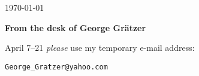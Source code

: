 \documentclass{sample}
\begin{document}
\begin{flushright}
   \today
\end{flushright}
\textbf{From the desk of George Gr\"{a}tzer}

April 7--21 \emph{please} use my 
temporary e-mail address:
\begin{center}
   \texttt{George\_Gratzer@yahoo.com}
\end{center}
\end{document}
